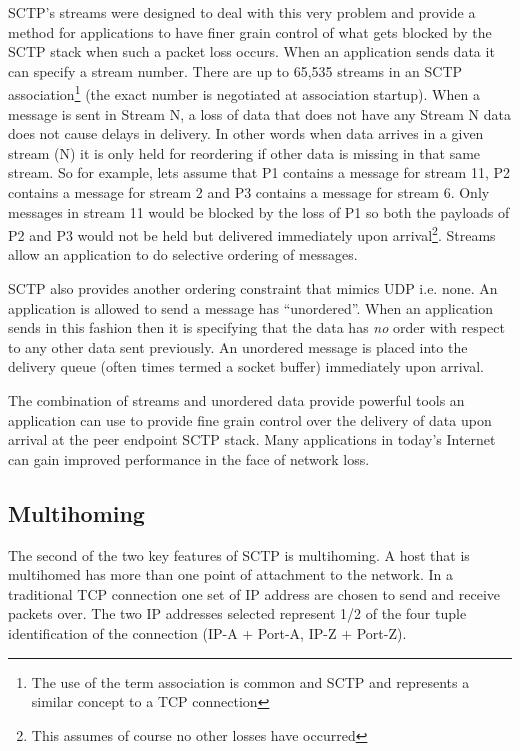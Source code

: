 \documentclass[conference]{IEEEtran}
\begin{document}
SCTP's streams were designed to deal with this very problem and provide a
method for applications to have finer grain control of what gets blocked by
the SCTP stack when such a packet loss occurs. When an application sends
data it can specify a stream number. There are up to 65,535 streams in an
SCTP association\footnote{The use of the term association is common and SCTP and represents a similar
concept to a TCP connection} (the exact number is negotiated at association startup).
When a message is sent in Stream N, a loss of data  that does not have
any Stream N data does not cause delays in delivery. In other words when data arrives
in a given stream (N) it is only held for reordering if other data is missing in that same stream.
So for example, lets assume that P1 contains a message for stream 11, P2 contains a message for stream 2 and 
P3 contains a message for stream 6. Only messages in stream 11 would be blocked by
the loss of P1 so both the payloads of P2 and P3 would not be held but delivered 
immediately upon arrival\footnote{This assumes of course no other losses have occurred}.
Streams allow an application to do selective ordering of messages. 

SCTP also provides another ordering constraint that mimics UDP i.e. none. An application
is allowed to send a message has ``unordered''. When an application sends in this
fashion then it is specifying that the data has \emph{no} order with respect to any other
data sent previously. An unordered message is placed into the delivery queue (often
times termed a socket buffer) immediately upon arrival. 

The combination of streams and unordered data provide powerful tools an application
can use to provide fine grain control over the delivery of data upon arrival at
the peer endpoint SCTP stack. Many applications in today's Internet can gain
improved performance in the face of network loss.

\subsection{Multihoming}
\label{multi}
The second of the two key features of SCTP is multihoming. A host that
is multihomed has more than one point of attachment to the network.
In a traditional TCP connection one set of IP address are chosen to 
send and receive packets over. The two IP addresses selected represent
1/2 of the four tuple identification of the connection (IP-A + Port-A, IP-Z + Port-Z).
\end{document}

